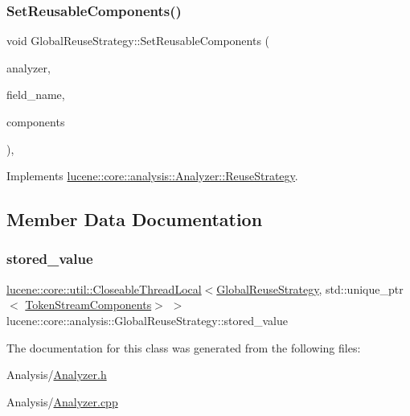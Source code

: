 \subsubsection{\texorpdfstring{Set\+Reusable\+Components()}{SetReusableComponents()}}
{\footnotesize\ttfamily void Global\+Reuse\+Strategy\+::\+Set\+Reusable\+Components (\begin{DoxyParamCaption}\item[{\mbox{\hyperlink{classlucene_1_1core_1_1analysis_1_1Analyzer}{Analyzer}} \&}]{analyzer,  }\item[{const std\+::string \&}]{field\+\_\+name,  }\item[{\mbox{\hyperlink{classlucene_1_1core_1_1analysis_1_1TokenStreamComponents}{Token\+Stream\+Components}} $\ast$}]{components }\end{DoxyParamCaption})\hspace{0.3cm}{\ttfamily [override]}, {\ttfamily [virtual]}}



Implements \mbox{\hyperlink{classlucene_1_1core_1_1analysis_1_1Analyzer_1_1ReuseStrategy_a78a1328d5564e78e2168169b73094b23}{lucene\+::core\+::analysis\+::\+Analyzer\+::\+Reuse\+Strategy}}.



\subsection{Member Data Documentation}
\mbox{\label{classlucene_1_1core_1_1analysis_1_1GlobalReuseStrategy_aa46c26280248f8f15c138db30d2a5991}} 
\subsubsection{\texorpdfstring{stored\+\_\+value}{stored\_value}}
{\footnotesize\ttfamily \mbox{\hyperlink{classlucene_1_1core_1_1util_1_1CloseableThreadLocal}{lucene\+::core\+::util\+::\+Closeable\+Thread\+Local}}$<$\mbox{\hyperlink{classlucene_1_1core_1_1analysis_1_1GlobalReuseStrategy}{Global\+Reuse\+Strategy}}, std\+::unique\+\_\+ptr$<$ \mbox{\hyperlink{classlucene_1_1core_1_1analysis_1_1TokenStreamComponents}{Token\+Stream\+Components}}$>$ $>$ lucene\+::core\+::analysis\+::\+Global\+Reuse\+Strategy\+::stored\+\_\+value\hspace{0.3cm}{\ttfamily [private]}}



The documentation for this class was generated from the following files\+:\begin{DoxyCompactItemize}
\item 
Analysis/\mbox{\hyperlink{Analyzer_8h}{Analyzer.\+h}}\item 
Analysis/\mbox{\hyperlink{Analyzer_8cpp}{Analyzer.\+cpp}}\end{DoxyCompactItemize}
